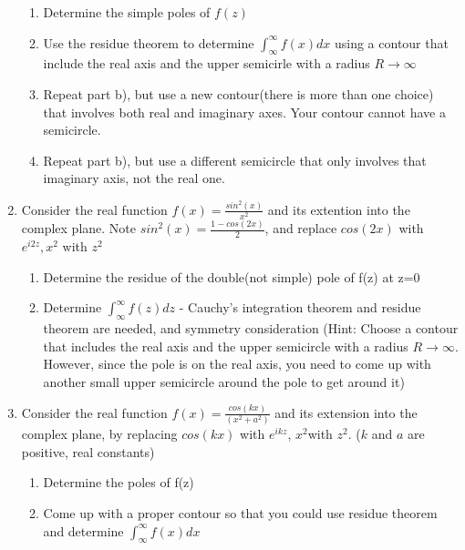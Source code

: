\documentclass[12pt]{article}
\begin{document}
\begin{enumerate}
\begin{enumerate}
	    \item Determine the simple poles of $f(z)$
	\item Use the residue theorem to determine $\int_{\infty}^{\infty} f(x)dx$ using a contour that include the real axis and the upper semicirle with a radius $R \to \infty$
	
	\item Repeat part b), but use a new contour(there is more than one choice) that involves both real and imaginary axes. Your contour cannot have a semicircle.

	\item Repeat part b), but use a different semicircle that only involves that imaginary axis, not the real one.

	\end{enumerate}

	\item Consider the real function $f(x) = \frac{sin^{2}(x)}{x^{2}}$ and its extention into the complex plane. Note $sin^{2}(x) = \frac{1-cos(2x)}{2}$, and replace $cos(2x)$ with $e^{i2z}, x^{2}$ with $z^{2}$
		\begin{enumerate}

		    \item Determine the residue of the double(not simple) pole of f(z) at z=0
		\item Determine $\int_{\infty}^{\infty} f(z)dz$ - Cauchy's integration theorem and residue theorem are needed, and symmetry consideration (Hint: Choose a contour that includes the real axis and the upper semicircle with a radius $R \to \infty$. However, since the pole is on the real axis, you need to come up with another small upper semicircle around the pole to get around it)


		\end{enumerate}


	\item Consider the real function $f(x) = \frac{cos(kx)}{(x^{2}+a^{2})}$ and its extension into the complex plane, by replacing $cos(kx)$ with $e^{ikz}$, $x^{2}$with $z^{2}$. ($k$ and $a$ are positive, real constants) 
		\begin{enumerate}

		    \item Determine the poles of f(z)
		\item Come up with a proper contour so that you could use residue theorem and determine $\int_{\infty}^{\infty} f(x) dx$

		\end{enumerate}


\end{enumerate}
\end{document}
